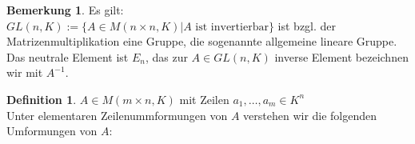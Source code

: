\documentclass[10pt,a4paper,numbers=endperiod]{scrartcl}
\theoremstyle{definition}
\newtheorem{defi}[satz]{Definition}
\newtheorem{bem}[satz]{Bemerkung}
\begin{document}
\begin{bem}
	Es gilt:\\
	$GL(n,K) := \{A \in M(n \times n, K)| A \text{ ist invertierbar}\}$ ist bzgl. der Matrizenmultiplikation eine Gruppe, die sogenannte allgemeine lineare Gruppe. Das neutrale Element ist $E_n$, das zur $A \in GL(n,K)$ inverse Element bezeichnen wir mit $A^{-1}$.
\end{bem}
\newpage
\begin{defi}
	$A \in M(m \times n,K)$ mit Zeilen $a_1, \ldots, a_m \in K^n$\\
	Unter elementaren Zeilenummformungen von $A$ verstehen wir die folgenden Umformungen von $A$: 
\end{defi}
\end{document}

